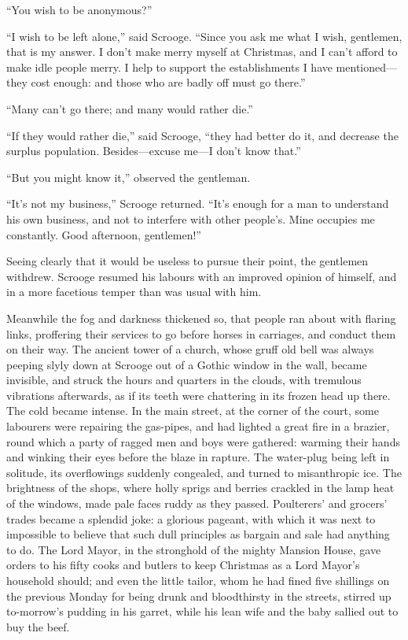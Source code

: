 \documentclass[paper=5.5in:8.5in,BCOR=15mm,twoside,DIV=15,headinclude=off,12pt,chapterprefix=off,openany,headings=huge]{scrbook} %
\begin{document}
\enquote{You wish to be anonymous?}

\enquote{I wish to be left alone,} said Scrooge. \enquote{Since you ask me what I wish, gentlemen, that is my answer. I don't make merry myself at Christmas, and I can't afford to make idle people merry. I help to support the establishments I have mentioned—they cost enough: and those who are badly off must go there.}

\enquote{Many can't go there; and many would rather die.}

\enquote{If they would rather die,} said Scrooge, \enquote{they had better do it, and decrease the surplus population. Besides—excuse me—I don't know that.}

\enquote{But you might know it,} observed the gentleman.

\enquote{It's not my business,} Scrooge returned. \enquote{It's enough for a man to understand his own business, and not to interfere with other people's. Mine occupies me constantly. Good afternoon, gentlemen!}

Seeing clearly that it would be useless to pursue their point, the gentlemen withdrew. Scrooge resumed his labours with an improved opinion of himself, and in a more facetious temper than was usual with him.

Meanwhile the fog and darkness thickened so, that people ran about with flaring links, proffering their services to go before horses in carriages, and conduct them on their way. The ancient tower of a church, whose gruff old bell was always peeping slyly down at Scrooge out of a Gothic window in the wall, became invisible, and struck the hours and quarters in the clouds, with tremulous vibrations afterwards, as if its teeth were chattering in its frozen head up there. The cold became intense. In the main street, at the corner of the court, some labourers were repairing the gas-pipes, and had lighted a great fire in a brazier, round which a party of ragged men and boys were gathered: warming their hands and winking their eyes before the blaze in rapture. The water-plug being left in solitude, its overflowings suddenly congealed, and turned to misanthropic ice. The brightness of the shops, where holly sprigs and berries crackled in the lamp heat of the windows, made pale faces ruddy as they passed. Poulterers' and grocers' trades became a splendid joke: a glorious pageant, with which it was next to impossible to believe that such dull principles as bargain and sale had anything to do. The Lord Mayor, in the stronghold of the mighty Mansion House, gave orders to his fifty cooks and butlers to keep Christmas as a Lord Mayor's household should; and even the little tailor, whom he had fined five shillings on the previous Monday for being drunk and bloodthirsty in the streets, stirred up to-morrow's pudding in his garret, while his lean wife and the baby sallied out to buy the beef.
\end{document}
